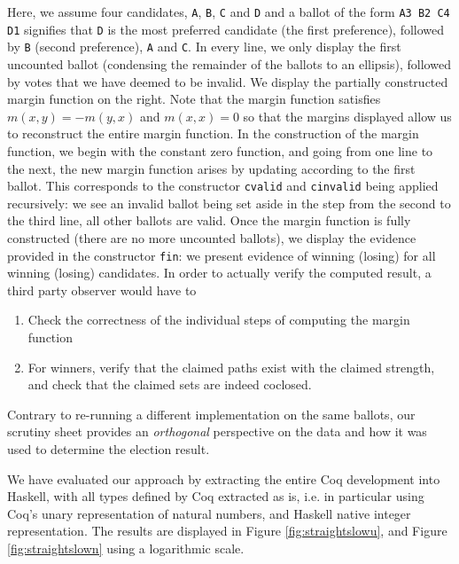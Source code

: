 \noindent
Here, we assume four candidates, \texttt{A}, \texttt{B}, \texttt{C}
and \texttt{D} and a ballot of the form \texttt{A3  B2  C4  D1}
signifies that \texttt{D} is the most preferred candidate (the first
preference), followed by \texttt{B} (second preference), \texttt{A}
and \texttt{C}. In every line, we only display the first uncounted
ballot (condensing the remainder of the ballots to an ellipsis),
followed by votes that we have deemed to be invalid. We display the
partially constructed margin function on the right. Note that the
margin function satisfies  $m(x, y) = -m(y, x)$ and $m(x, x) = 0$ so
that the margins displayed allow us to reconstruct the entire margin
function. In the construction of the margin function, we begin with
the constant zero function, and going from one line to the next, the
new margin function arises by updating according to the first
ballot. This corresponds to the constructor \texttt{cvalid} and
\texttt{cinvalid} being
applied recursively: we see an invalid ballot being set aside in the
step from the second to the third line, all other ballots are valid.
Once the margin function is fully constructed (there are no
more uncounted ballots), we display the evidence provided in the
constructor \texttt{fin}: we present evidence of winning (losing) for
all winning (losing) candidates. 
%
In order to actually verify the computed result, a third party
observer would have to
\begin{enumerate}
\item Check the correctness of the individual steps of computing the
margin function
\item For winners, verify that the claimed paths exist with the
claimed strength, and check that the claimed sets are indeed
coclosed.
\end{enumerate}

\noindent
Contrary to re-running a different implementation on the same
ballots, our scrutiny sheet provides an \emph{orthogonal}
perspective on the data and how it was used to determine the
election result.



We have evaluated our approach by extracting the entire Coq
development into Haskell, with all types defined by Coq extracted as
is, i.e. in particular using Coq's unary representation of natural
numbers, and Haskell native integer representation. The results are displayed in Figure \ref{fig:straightslowu}, 
and Figure \ref{fig:straightslown}
using a logarithmic scale. 




